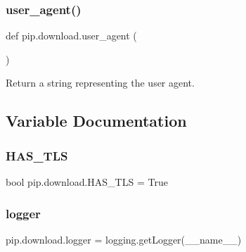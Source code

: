 \subsubsection{\texorpdfstring{user\+\_\+agent()}{user\_agent()}}
{\footnotesize\ttfamily def pip.\+download.\+user\+\_\+agent (\begin{DoxyParamCaption}{ }\end{DoxyParamCaption})}

\begin{DoxyVerb}Return a string representing the user agent.
\end{DoxyVerb}
 

\subsection{Variable Documentation}
\mbox{\label{namespacepip_1_1download_a76157632746f2b98b33010db6ebbad83}} 
\subsubsection{\texorpdfstring{H\+A\+S\+\_\+\+T\+LS}{HAS\_TLS}}
{\footnotesize\ttfamily bool pip.\+download.\+H\+A\+S\+\_\+\+T\+LS = True}

\mbox{\label{namespacepip_1_1download_ac16ff9630d200de4db31f3da4ca8352f}} 
\subsubsection{\texorpdfstring{logger}{logger}}
{\footnotesize\ttfamily pip.\+download.\+logger = logging.\+get\+Logger(\+\_\+\+\_\+name\+\_\+\+\_\+)}


